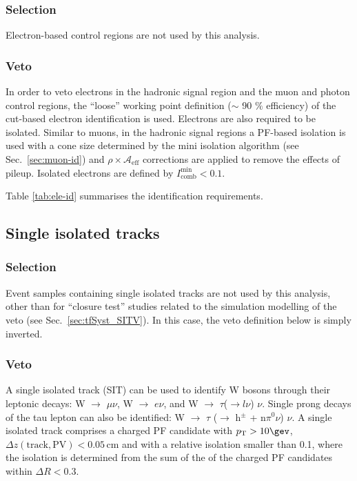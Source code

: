 \subsubsection{Selection}

Electron-based control regions are not used by this analysis. 

\subsubsection{Veto}

In order to veto electrons in the hadronic signal region and the muon
and photon control regions, the ``loose'' working point definition
($\sim$ 90 $\%$ efficiency) of the cut-based electron identification
\cite{electron-id} is used.  Electrons are also required to be
isolated.  Similar to muons, in the hadronic signal regions a PF-based
isolation \cite{pf-photon} is used with a cone size determined by the
mini isolation algorithm (see Sec.~\ref{sec:muon-id}) and $\rho\times
\mathcal{A}_\textrm{eff}$ corrections are applied to remove the effects of pileup.
Isolated electrons are defined by $I^\mathrm{min}_\mathrm{comb} < 0.1$.

Table \ref{tab:ele-id} summarises the identification requirements. 

\subsection{Single isolated tracks}
\label{sec:SIT}

\subsubsection{Selection}

Event samples containing single isolated tracks are not used by this
analysis, other than for ``closure test'' studies related to the
simulation modelling of the veto (\eg see
Sec.~\ref{sec:tfSyst_SITV}). In this case, the veto definition below
is simply inverted.

\subsubsection{Veto}

A single isolated track (SIT) can be used to identify W bosons through
their leptonic decays: W $\rightarrow$ $\mu \nu$, W $\rightarrow$
$e\nu$, and W $\rightarrow$ $\tau$($\rightarrow l\nu$) $\nu$.  Single
prong decays of the tau lepton can also be identified: W $\rightarrow$
$\tau$ ($\rightarrow$ h$^{\pm}$ + n$\pi^{0}\nu$) $\nu$.  A single
isolated track comprises a charged PF candidate with $\Pt > 10 \gev$,
$\Delta z(\mathrm{track}, \mathrm{PV}) < 0.05 \, \mathrm{cm}$ and with
a relative isolation smaller than 0.1, where the isolation is
determined from the sum of the \Pt of the charged PF candidates within
$\Delta R < 0.3$.

